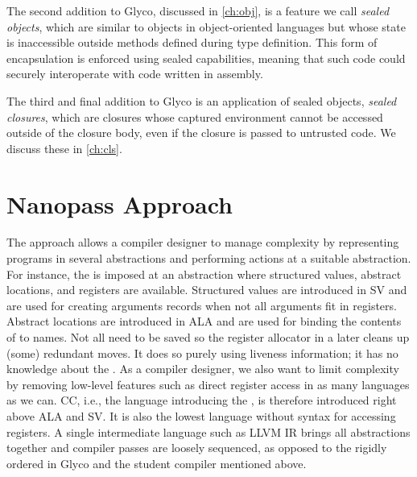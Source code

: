 \documentclass[main.tex]{subfiles}
\begin{document}
The second addition to Glyco, discussed in \cref{ch:obj}, is a feature we call \emph{sealed objects}, which are similar to objects in object-oriented languages but whose state is inaccessible outside methods defined during type definition. This form of encapsulation is enforced using sealed capabilities, meaning that such code could securely interoperate with code written in assembly.

The third and final addition to Glyco is an application of sealed objects, \emph{sealed closures}, which are closures whose captured environment cannot be accessed outside of the closure body, even if the closure is passed to untrusted code. We discuss these in \cref{ch:cls}.

\section{Nanopass Approach}
The  approach allows a compiler designer to manage complexity by representing programs in several abstractions and performing actions at a suitable abstraction. For instance, the  is imposed at an abstraction where structured values, abstract locations, and registers are available. Structured values are introduced in SV and are used for creating arguments records when not all arguments fit in registers. Abstract locations are introduced in ALA and are used for binding the contents of  to names. Not all  need to be saved so the register allocator in a later  cleans up (some) redundant moves. It does so purely using liveness information; it has no knowledge about the . As a compiler designer, we also want to limit complexity by removing low-level features such as direct register access in as many languages as we can. CC, i.e., the language introducing the , is therefore introduced right above ALA and SV. It is also the lowest language without syntax for accessing registers. A single intermediate language such as LLVM IR brings all abstractions together and compiler passes are loosely sequenced, as opposed to the rigidly ordered  in Glyco and the student compiler mentioned above.
\end{document}
